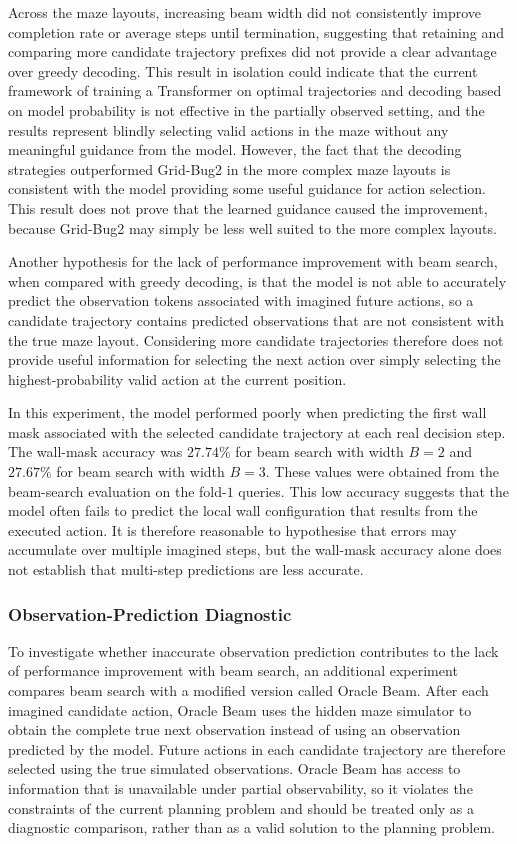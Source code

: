 ﻿\documentclass[12pt,a4paper]{article}
\theoremstyle{definition}
\begin{document}
Across the maze layouts, increasing beam width did not consistently improve completion 
rate or average steps until termination, suggesting that retaining and comparing more 
candidate trajectory prefixes did not provide a clear advantage over greedy decoding.
This result in isolation could indicate	
that the current framework of training a Transformer on optimal trajectories and decoding based on model 
probability is not effective in the partially observed setting, and the results represent blindly
selecting valid actions in the maze without any meaningful guidance from the model. However, the fact that the decoding strategies
outperformed Grid-Bug2 in the more complex maze layouts is consistent with the model providing some useful 
guidance for action selection. This result does not prove that the learned guidance caused the improvement,
because Grid-Bug2 may simply be less well suited to the more complex layouts.

Another hypothesis for the lack of performance improvement with beam search, when compared with greedy
decoding, is that the model
is not able to accurately predict the observation tokens associated with imagined future actions,
so a candidate trajectory contains predicted observations that are not consistent with the true maze layout. Considering
more candidate trajectories therefore does not provide useful information for selecting the next action
over simply selecting the highest-probability valid action at the current position. 

In this experiment, the model performed poorly when predicting the first wall mask associated
with the selected candidate trajectory at each real decision step. The wall-mask accuracy was $27.74\%$
for beam search with width $B=2$ and $27.67\%$ for beam search with width $B=3$. These values were obtained
from the beam-search evaluation on the fold-$1$ queries. This low accuracy suggests that the model often fails
to predict the local wall configuration that results from the executed action. It is therefore reasonable to hypothesise that errors
may accumulate over multiple imagined steps, but the wall-mask accuracy alone does not establish that
multi-step predictions are less accurate.

\subsubsection{Observation-Prediction Diagnostic}


To investigate whether inaccurate observation prediction contributes to the lack of performance
improvement with beam search, an additional experiment compares beam search with a modified version
called Oracle Beam. After each imagined candidate action, Oracle Beam uses the hidden maze
simulator to obtain the complete true next observation instead of using an observation predicted by
the model. Future actions in each candidate trajectory are therefore selected using the true simulated
observations. Oracle Beam has access to information that is unavailable under partial observability,
so it violates the constraints of the current planning problem and should be treated only as a
diagnostic comparison, rather than as a valid solution to the planning problem.
\end{document}
